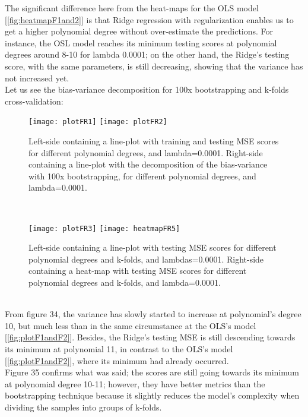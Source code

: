 The significant difference here from the heat-maps for the OLS model [\ref{fig:heatmapF1and2}] is that Ridge regression with regularization enables us to get a higher polynomial degree without over-estimate the predictions. For instance, the OSL model reaches its minimum testing scores at polynomial degrees around 8-10 for lambda 0.0001; on the other hand, the Ridge's testing score, with the same parameters, is still decreasing, showing that the variance has not increased yet. \\

Let us see the bias-variance decomposition for 100x bootstrapping and k-folds cross-validation: \\

\begin{figure}[H]
\label{fig:plotFR1and2}
\centering
\texttt{[image: plotFR1]}
\texttt{[image: plotFR2]}
\caption{Left-side containing a line-plot with training and testing MSE scores for different polynomial degrees, and lambda=0.0001. Right-side containing a line-plot with the decomposition of the bias-variance with 100x bootstrapping, for different polynomial degrees, and lambda=0.0001.}
\end{figure}\\

\begin{figure}[H]
\label{fig:plotFR3andH5}
\centering
\texttt{[image: plotFR3]}
\texttt{[image: heatmapFR5]}
\caption{Left-side containing a line-plot with testing MSE scores for different polynomial degrees and k-folds, and lambdas=0.0001. Right-side containing a heat-map with testing MSE scores for different polynomial degrees and k-folds, and lambda=0.0001.}
\end{figure}\\

From figure 34, the variance has slowly started to increase at polynomial's degree 10, but much less than in the same circumstance at the OLS's model [\ref{fig:plotF1andF2}]. Besides, the Ridge's testing MSE is still descending towards its minimum at polynomial 11, in contrast to the OLS's model [\ref{fig:plotF1andF2}], where its minimum had already occurred.\\

Figure 35 confirms what was said; the scores are still going towards its minimum at polynomial degree 10-11; however, they have better metrics than the bootstrapping technique because it slightly reduces the model's complexity when dividing the samples into groups of k-folds.\\

